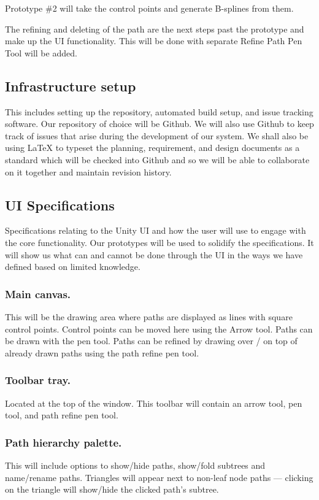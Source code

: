 \documentclass[12pt]{article}
\begin{document}
Prototype \#2 will take the control points and generate B-splines from them.

The refining and deleting of the path are the next steps past the prototype and make up the UI functionality. This will be done with separate Refine Path Pen Tool will be added.

\subsection{Infrastructure setup}
This includes setting up the repository, automated build setup, and issue tracking software. Our repository of choice will be Github. We will also use Github to keep track of issues that arise during the development of our system. We shall also be using LaTeX to typeset the planning, requirement, and design documents as a standard which will be checked into Github and so we will be able to collaborate on it together and maintain revision history.

\subsection{UI Specifications}
Specifications relating to the Unity UI and how the user will use to engage with the core functionality. Our prototypes will be used to solidify the specifications. It will show us what can and cannot be done through the UI in the ways we have defined based on limited knowledge.

\subsubsection{Main canvas.} This will be the drawing area where paths are displayed as lines with square control points. Control points can be moved here using the Arrow tool. Paths can be drawn with the pen tool. Paths can be refined by drawing over / on top of already drawn paths using the path refine pen tool.

\subsubsection{Toolbar tray.} Located at the top of the window. This toolbar will contain an arrow tool, pen tool, and path refine pen tool.

\subsubsection{Path hierarchy palette.} This will include options to show/hide paths, show/fold subtrees and name/rename paths. Triangles will appear next to non-leaf node paths --- clicking on the triangle will show/hide the clicked path’s subtree.
\end{document}
